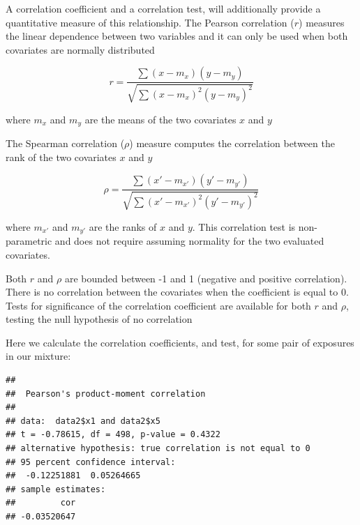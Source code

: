 \documentclass[
]{book}
\newenvironment{Shaded}{\begin{snugshade}}{\end{snugshade}}
\newcommand{\AttributeTok}[1]{\textcolor[rgb]{0.77,0.63,0.00}{#1}}
\newcommand{\FunctionTok}[1]{\textcolor[rgb]{0.00,0.00,0.00}{#1}}
\newcommand{\NormalTok}[1]{#1}
\newcommand{\OtherTok}[1]{\textcolor[rgb]{0.56,0.35,0.01}{#1}}
\newcommand{\SpecialCharTok}[1]{\textcolor[rgb]{0.00,0.00,0.00}{#1}}
\newcommand{\StringTok}[1]{\textcolor[rgb]{0.31,0.60,0.02}{#1}}
\begin{document}
A correlation coefficient and a correlation test, will additionally provide a quantitative measure of this relationship. The Pearson correlation (\(r\)) measures the linear dependence between two variables and it can only be used when both covariates are normally distributed

\[r=\frac{\sum(x-m_x)(y-m_y)}{\sqrt{\sum(x-m_x)^2(y-m_y)^2}}\]

where \(m_x\) and \(m_y\) are the means of the two covariates \(x\) and \(y\)

The Spearman correlation (\(\rho\)) measure computes the correlation between the rank of the two covariates \(x\) and \(y\)

\[\rho=\frac{\sum(x'-m_{x'})(y'-m_{y'})}{\sqrt{\sum(x'-m_{x'})^2(y'-m_{y'})^2}}\]

where \(m_{x'}\) and \(m_{y'}\) are the ranks of \(x\) and \(y\). This correlation test is non-parametric and does not require assuming normality for the two evaluated covariates.

Both \(r\) and \(\rho\) are bounded between -1 and 1 (negative and positive correlation). There is no correlation between the covariates when the coefficient is equal to 0. Tests for significance of the correlation coefficient are available for both \(r\) and \(\rho\), testing the null hypothesis of no correlation

Here we calculate the correlation coefficients, and test, for some pair of exposures in our mixture:

\begin{Shaded}
\end{Shaded}

\begin{verbatim}
## 
##  Pearson's product-moment correlation
## 
## data:  data2$x1 and data2$x5
## t = -0.78615, df = 498, p-value = 0.4322
## alternative hypothesis: true correlation is not equal to 0
## 95 percent confidence interval:
##  -0.12251881  0.05264665
## sample estimates:
##         cor 
## -0.03520647
\end{verbatim}

\begin{Shaded}
\end{Shaded}
\end{document}
